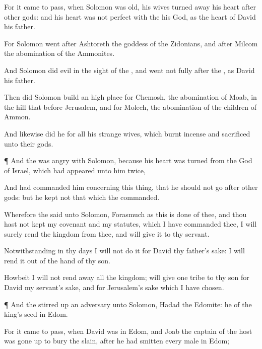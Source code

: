 {For it came to pass,
when
Solomon was
old,
{} his
wives turned
away his
heart
after
other
gods: and his
heart was not
perfect with the
{} his
God, as
{} the
heart of
David his
father.

For
Solomon
went
after
Ashtoreth the
goddess of the
Zidonians, and
after
Milcom the
abomination of the
Ammonites.

And
Solomon
did
evil in the
sight of the
{}, and went not
fully
after the
{}, as
{}
David his
father.

Then did
Solomon
build an high
place for
Chemosh, the
abomination of
Moab, in the
hill that
{}
before
Jerusalem, and for
Molech, the
abomination of the
children of
Ammon.

And likewise
did he for all his
strange
wives, which burnt
incense and
sacrificed unto their
gods.


\par }{\PP {}¶ And the
{} was
angry with
Solomon, because his
heart was
turned from the
{}
God of
Israel, which had
appeared unto him
twice,

And had
commanded him concerning this
thing, that he should not
go
after
other
gods: but he
kept not that which the
{}
commanded.

Wherefore the
{}
said unto
Solomon, Forasmuch as this is done of thee, and thou hast not
kept my
covenant and my
statutes, which I have
commanded thee, I will
surely
rend the
kingdom from thee, and will
give it to thy
servant.

Notwithstanding in thy
days I will not
do it for
David thy
father’s sake:
{} I will
rend it out of the
hand of thy
son.

Howbeit I will not rend
away all the
kingdom;
{} will
give
one
tribe to thy
son for
David my
servant’s sake, and for
Jerusalem’s sake which I have
chosen.


\par }{\PP {}¶ And the
{} stirred
up an
adversary unto
Solomon,
Hadad the
Edomite: he
{} of the
king’s
seed in
Edom.

For it came to pass, when
David was in
Edom, and
Joab the
captain of the
host was gone
up to
bury the
slain, after he had
smitten every
male in
Edom;

}
